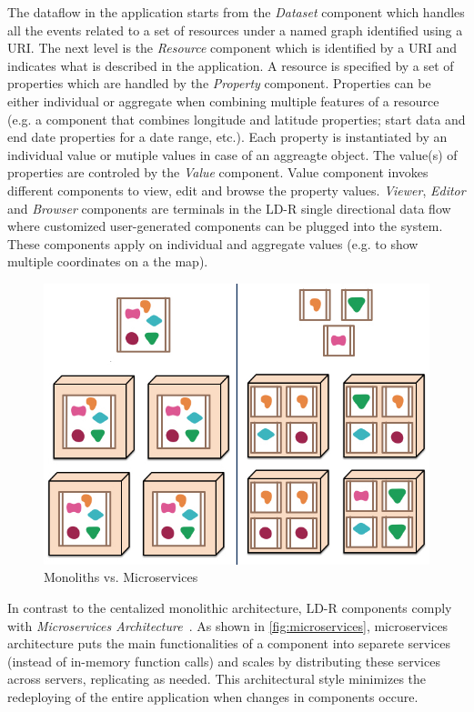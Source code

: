 \documentclass{acm_proc_article-sp}
\begin{document}
The dataflow in the application starts from the \emph{Dataset} component which handles all the events related to a set of resources under a named graph identified using a URI.
The next level is the \emph{Resource} component which is identified by a URI and indicates what is described in the application.
A resource is specified by a set of properties which are handled by the \emph{Property} component. 
Properties can be either individual or aggregate when combining multiple features of a resource (e.g. a component that combines longitude and latitude properties; start data and end date properties for a date range, etc.).
Each property is instantiated by an individual value or mutiple values in case of an aggreagte object. 
The value(s) of properties are controled by the \emph{Value} component.
Value component invokes different components to view, edit and browse the property values.
\emph{Viewer}, \emph{Editor} and \emph{Browser} components are terminals in the LD-R single directional data flow where customized user-generated components can be plugged into the system.
These components apply on individual and aggregate values (e.g. to show multiple coordinates on a the map).

\begin{figure}[tb]
  \includegraphics[width=.9\linewidth]{images/microservices.jpg}
  \caption{Monoliths vs. Microservices~\cite{microservices}}
  \label{fig:microservices}
\end{figure}

In contrast to the centalized monolithic architecture, LD-R components comply with \emph{Microservices Architecture}~\cite{microservices}.
As shown in \autoref{fig:microservices}, microservices architecture puts the main functionalities of a component into separete services (instead of in-memory function calls) and scales by distributing these services across servers, replicating as needed.
This architectural style minimizes the redeploying of the entire application when changes in components occure.
\end{document}
